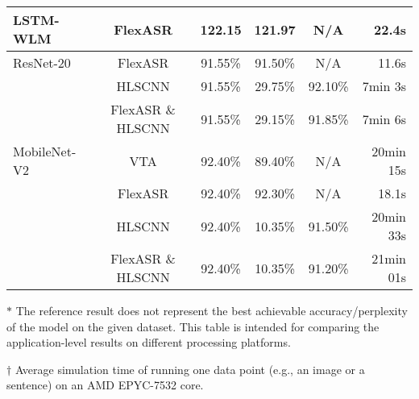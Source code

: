 \begin{table*}
\begin{small}
\begin{tabular}{|l|c|c|c|c|r|}
  LSTM-WLM & 
    FlexASR & 
    122.15 & 
    121.97 & 
    N/A &
    22.4s \\
    \hline


  ResNet-20 & 
    FlexASR &
    91.55\% &
    91.50\% &
    N/A &
    11.6s \\
    
   &
    HLSCNN &
    91.55\% &
    \cellcolor[HTML]{E9CECE}29.75\% &
    \cellcolor[HTML]{DDEFDE}92.10\% &
    7min 3s \\
    
   &
    FlexASR \& HLSCNN & 
    91.55\% & 
    \cellcolor[HTML]{E9CECE}29.15\% & 
    \cellcolor[HTML]{DDEFDE}91.85\% & 
    7min 6s \\ 
    \hline

  MobileNet-V2 &
    VTA &
    92.40\% &
    89.40\% &
    N/A &
    20min 15s \\
  
   &
    FlexASR &
    92.40\% &
    92.30\% &
    N/A &
    18.1s \\

   & 
    HLSCNN & 
    92.40\% & 
    \cellcolor[HTML]{E9CECE}10.35\% & 
    \cellcolor[HTML]{DDEFDE}91.50\% & 
    20min 33s \\
    
   & 
    FlexASR \& HLSCNN & 
    92.40\% & 
    \cellcolor[HTML]{E9CECE}10.35\% & 
    \cellcolor[HTML]{DDEFDE}91.20\% & 
    21min 01s \\


    \hline
  \end{tabular}
  \end{small}
  \begin{tablenotes}
    \item $\ast$ The reference result does not represent the best achievable accuracy/perplexity of the model on the given dataset. This table is intended for comparing the application-level results on different processing platforms.
    \item $\dagger$ Average simulation time of running one data point (e.g., an image or a sentence) on an AMD EPYC-7532 core.
  \end{tablenotes}
\end{table*}
